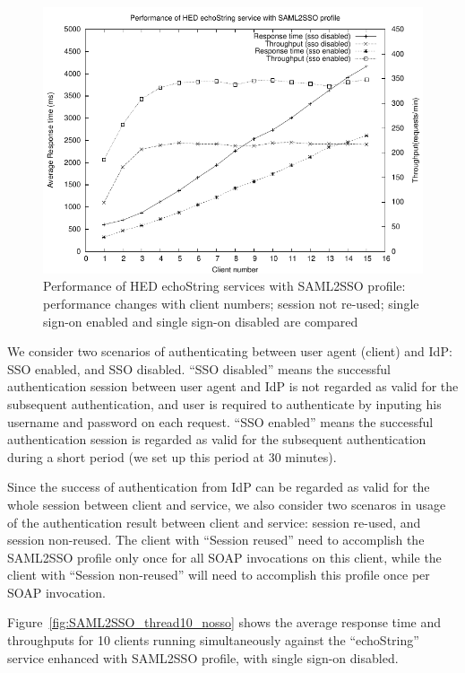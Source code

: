\documentclass[conference]{IEEEtran}
\begin{document}
\begin{figure}
\includegraphics[width=0.9\columnwidth]{SAML2SSO_thread_all.pdf}
\caption{Performance of HED echoString services with SAML2SSO profile:
performance changes with client numbers; session not re-used; single sign-on enabled and 
single sign-on disabled are compared}
\label{fig:SAML2SSO_thread_all}
\end{figure}

We consider two scenarios of authenticating between user agent (client) and IdP: 
SSO enabled, and SSO disabled. ``SSO disabled'' means the successful authentication
session between user agent and IdP is not regarded as valid for the subsequent authentication, and
user is required to authenticate by inputing his username and password on each request.
``SSO enabled'' means the successful authentication session is regarded as valid for the 
subsequent authentication during a short period (we set up this period at 30 minutes).

Since the success of authentication from IdP can be regarded as valid for the whole
session between client and service, we also consider two scenaros in 
usage of the authentication result between client and service: session re-used, and session non-reused.
The client with ``Session reused'' need to accomplish the SAML2SSO
profile only once for all SOAP invocations on this client, while the client with ``Session
non-reused'' will need to accomplish this profile once per SOAP invocation.

Figure~\ref{fig:SAML2SSO_thread10_nosso} shows the average response time and
throughputs for 10 clients running simultaneously against the ``echoString'' service enhanced with SAML2SSO
profile, with single sign-on disabled.
\end{document}
